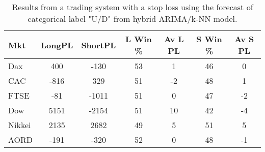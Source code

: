 \begin{table}[ht]
\centering
\caption[Results from a trading system with a stop loss using the forecast of categorical label "U/D" from hybrid ARIMA/k-NN model]{Results from a trading system with a stop loss using the forecast of categorical label "U/D" from hybrid ARIMA/k-NN model.} 
\label{tab:chp_ts:pUD_CAT_arima_knn_sys_SL}
\begin{tabular}{lcccccc}
  \toprule Mkt & LongPL & ShortPL & L Win \% & Av L PL & S Win \% & Av S PL \\ 
  \midrule Dax & 400 & -130 & 53 & 1 & 46 & 0 \\ 
  CAC & -816 & 329 & 51 & -2 & 48 & 1 \\ 
  FTSE & -81 & -1011 & 51 & 0 & 47 & -2 \\ 
  Dow & 5151 & -2154 & 51 & 10 & 42 & -4 \\ 
  Nikkei & 2135 & 2682 & 49 & 5 & 51 & 5 \\ 
  AORD & -191 & -320 & 52 & 0 & 48 & -1 \\ 
   \bottomrule \end{tabular}
\end{table}
